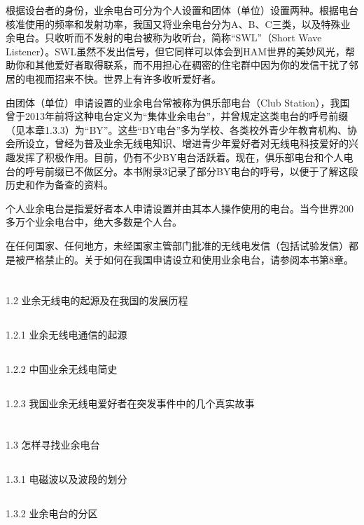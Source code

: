 \documentclass[12pt,UTF8]{ctexbook}
\begin{document}
根据设台者的身份，业余电台可分为个人设置和团体（单位）设置两种。根据电台核准使用的频率和发射功率，我国又将业余电台分为A、B、C三类，以及特殊业余电台。只收听而不发射的电台被称为收听台，简称“SWL”（Short Wave Listener）。SWL虽然不发出信号，但它同样可以体会到HAM世界的美妙风光，帮助你和其他爱好者取得联系，而不用担心在稠密的住宅群中因为你的发信干扰了邻居的电视而招来不快。世界上有许多收听爱好者。

由团体（单位）申请设置的业余电台常被称为俱乐部电台（Club Station），我国曾于2013年前将这种电台定义为“集体业余电台”，并曾规定这类电台的呼号前缀（见本章1.3.3）为“BY”。这些“BY电台”多为学校、各类校外青少年教育机构、协会所设立，曾经为普及业余无线电知识、增进青少年爱好者对无线电科技爱好的兴趣发挥了积极作用。目前，仍有不少BY电台活跃着。现在，俱乐部电台和个人电台的呼号前缀已不做区分。本书附录3记录了部分BY电台的呼号，以便于了解这段历史和作为备查的资料。

个人业余电台是指爱好者本人申请设置并由其本人操作使用的电台。当今世界200多万个业余电台中，绝大多数是个人台。

在任何国家、任何地方，未经国家主管部门批准的无线电发信（包括试验发信）都是被严格禁止的。关于如何在我国申请设立和使用业余电台，请参阅本书第8章。

\section{}1.2 业余无线电的起源及在我国的发展历程
\subsection{}1.2.1 业余无线电通信的起源
\subsection{}1.2.2 中国业余无线电简史
\subsection{}1.2.3 我国业余无线电爱好者在突发事件中的几个真实故事
\section{}1.3 怎样寻找业余电台
\subsection{}1.3.1 电磁波以及波段的划分
\subsection{}1.3.2 业余电台的分区
\end{document}
